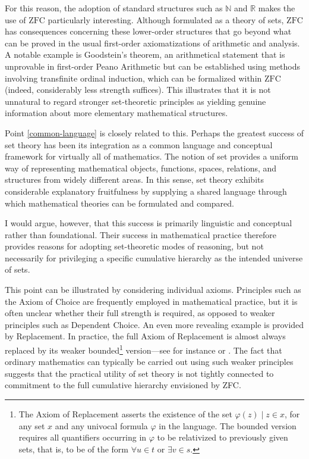 \documentclass[11pt,a4paper]{book}
\theoremstyle{plain}
\begin{document}
For this reason, the adoption of standard structures such as $\mathbb{N}$ and $\mathbb{R}$ makes the use of $\mathrm{ZFC}$ particularly interesting. Although formulated as a theory of sets, $\mathrm{ZFC}$ has consequences concerning these lower-order structures that go beyond what can be proved in the usual first-order axiomatizations of arithmetic and analysis. A notable example is Goodstein's theorem, an arithmetical statement that is unprovable in first-order Peano Arithmetic but can be established using methods involving transfinite ordinal induction, which can be formalized within $\mathrm{ZFC}$ (indeed, considerably less strength suffices). This illustrates that it is not unnatural to regard stronger set-theoretic principles as yielding genuine information about more elementary mathematical structures.


Point \ref{common-language} is closely related to this. Perhaps the greatest success of set theory has been its integration as a common language and conceptual framework for virtually all of mathematics. The notion of set provides a uniform way of representing mathematical objects, functions, spaces, relations, and structures from widely different areas. In this sense, set theory exhibits considerable explanatory fruitfulness by supplying a shared language through which mathematical theories can be formulated and compared.

I would argue, however, that this success is primarily linguistic and conceptual rather than foundational. Their success in mathematical practice therefore provides reasons for adopting set-theoretic modes of reasoning, but not necessarily for privileging a specific cumulative hierarchy as the intended universe of sets.

This point can be illustrated by considering individual axioms. Principles such as the Axiom of Choice are frequently employed in mathematical practice, but it is often unclear whether their full strength is required, as opposed to weaker principles such as Dependent Choice. An even more revealing example is provided by Replacement. In practice, the full Axiom of Replacement is almost always replaced by its weaker bounded\footnote{The Axiom of Replacement asserts the existence of the set ${\varphi(z)\mid z\in x}$, for any set $x$ and any univocal formula $\varphi$ in the language. The bounded version requires all quantifiers occurring in $\varphi$ to be relativized to previously given sets, that is, to be of the form $\forall u\in t$ or $\exists v\in s$.} version---see for instance \textcite[postnote]{maclane1986mathematics} or \textcite[2]{McLarty2020}. The fact that ordinary mathematics can typically be carried out using such weaker principles suggests that the practical utility of set theory is not tightly connected to commitment to the full cumulative hierarchy envisioned by ZFC.
\end{document}
